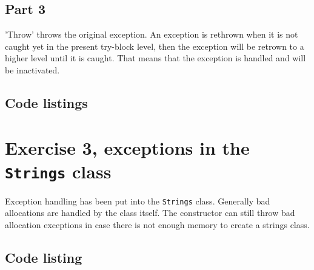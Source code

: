 \documentclass[11pt]{article}
\begin{document}
\subsection*{Part 3}
'Throw' throws the original exception. An exception is rethrown when it is not caught yet in the present try-block level, then the exception will be retrown to a higher level until it is caught.
That means that the exception is handled and will be inactivated.

\subsection*{Code listings}



\section*{Exercise 3, exceptions in the \texttt{Strings} class}
Exception handling has been put into the \texttt{Strings} class.
Generally bad allocations are handled by the class itself.
The constructor can still throw bad allocation exceptions in case there is not enough memory to create a strings class.

\subsection*{Code listing}










\end{document}
